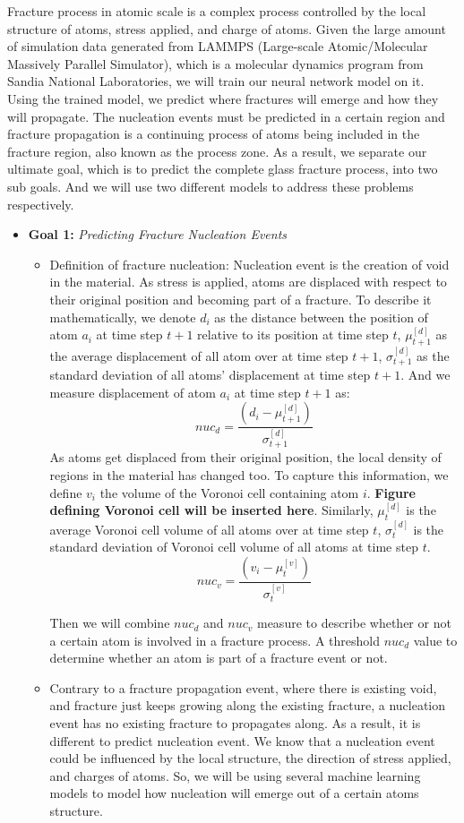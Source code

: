 
Fracture process in atomic scale is a complex process controlled by the local structure of atoms, stress applied, and charge of atoms. 
Given the large amount of simulation data generated from LAMMPS (Large-scale Atomic/Molecular Massively Parallel Simulator), which is a molecular dynamics program from Sandia National Laboratories, we will train our neural network model on it. Using the trained model, we predict where fractures will emerge and how they will propagate. The nucleation events must be predicted in a certain region and fracture propagation is a continuing process of atoms being included in the fracture region, also known as the process zone. As a result, we separate our ultimate goal, which is to predict the complete glass fracture process, into two sub goals. And we will use two different models to address these problems respectively. 


\begin{itemize}
\item \textbf{Goal 1:} \emph{Predicting Fracture Nucleation Events} 
\begin{itemize} 
    \item Definition of fracture nucleation: Nucleation event is the creation of void in the material. As stress is applied, atoms are displaced with respect to their original position and becoming part of a fracture. To describe it mathematically, we denote $d_i$ as the distance between the position of atom $a_i$ at time step $t+1$ relative to its position at time step $t$, $\mu^{[d]}_{t+1}$ as the average displacement of all atom over at time step $t+1$, $\sigma^{[d]}_{t+1}$ as the standard deviation of all atoms' displacement at time step $t+1$. And we measure displacement of atom $a_i$ at time step $t+1$ as:
    \[
    nuc_d = \frac{(d_i - \mu^{[d]}_{t+1})}{\sigma^{[d]}_{t+1}}
    \]
    As atoms get displaced from their original position, the local density of regions in the material has changed too. To capture this information, we define $v_i$ the volume of the Voronoi cell containing atom $i$. \textbf{Figure defining Voronoi cell will be inserted here}. Similarly, $\mu^{[d]}_{t}$ is the average Voronoi cell volume of all atoms over at time step $t$, $\sigma^{[d]}_{t}$ is the standard deviation of Voronoi cell volume of all atoms at time step $t$. 
    \[
    nuc_v = \frac{(v_i - \mu^{[v]}_{t})}{\sigma^{[v]}_{t}}
    \]
    
    
    Then we will combine $nuc_d$ and $nuc_v$ measure to describe whether or not a certain atom is involved in a fracture process. A threshold $nuc_d$ value to determine whether an atom is part of a fracture event or not.
    \item Contrary to a fracture propagation event, where there is existing void, and fracture just keeps growing along the existing fracture, a nucleation event has no existing fracture to propagates along. As a result, it is different to predict nucleation event. We know that a nucleation event could be influenced by the local structure, the direction of stress applied, and charges of atoms. So, we will be using several machine learning models to model how nucleation will emerge out of a certain atoms structure. 
\end{itemize}
\end{itemize}


